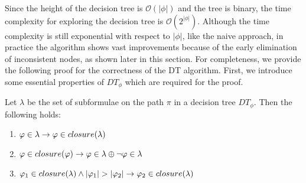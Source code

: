 Since the height of the decision tree is $\mathcal{O}(|\phi|)$ and the tree is binary, the time complexity for exploring the decision tree is $\mathcal{O}(2^{|\phi|})$. Although the time complexity is still exponential with respect to $|\phi|$, like the naive approach, in practice the algorithm shows vast improvements because of the early elimination of inconsistent nodes, as shown later in this section. For completeness, we provide the following proof for the correctness of the DT algorithm. First, we introduce some essential properties of $DT_\phi$ which are required for the proof.

\begin{definition}
\label{def:dt-props}
Let $\lambda$ be the set of subformulae on the path $\pi$ in a decision tree $DT_\phi$. Then the following holds:
\begin{enumerate}[label=(\alph*)]
    \item \label{def:dt-prop1} $\varphi \in \lambda \rightarrow \varphi \in closure(\lambda)$
    \item \label{def:dt-prop2} $\varphi \in closure(\varphi) \rightarrow \varphi \in \lambda \oplus \lnot \varphi \in \lambda$
    \item \label{def:dt-prop3} $\varphi_1 \in closure(\lambda) \land |\varphi_1| > |\varphi_2| \rightarrow \varphi_2 \in closure(\lambda)$
\end{enumerate}
\end{definition}

